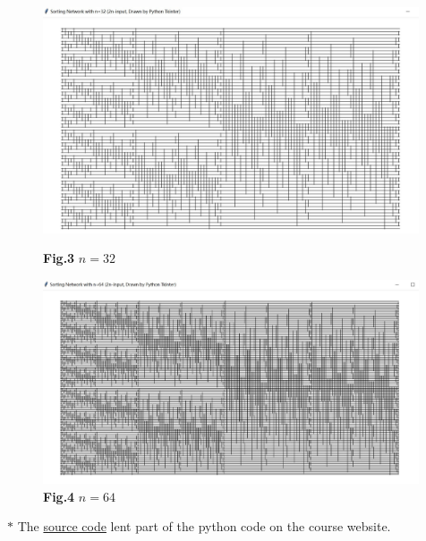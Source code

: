 \documentclass[12pt,a4paper,UTF8]{article}
\theoremstyle{definition}
\begin{document}
\begin{enumerate}
\begin{enumerate}
    	\begin{figure}[htbp]
    		\begin{minipage}[h]{0.48\textwidth}
    			\centering
    			\includegraphics[width=0.99\textwidth]{32.pdf}
    			\caption*{\textbf{Fig.3} $n = 32$} \label{Fig-32}
    		\end{minipage}
    		\hspace{5mm}
    		\begin{minipage}[h]{0.54\textwidth}
    			\centering
    			\includegraphics[width=0.99\textwidth]{64.pdf}
    			\caption*{\textbf{Fig.4} $n = 64$} \label{Fig-64}
    		\end{minipage}
    	\end{figure}	
    	\footnotesize{$*$ The \href{run:OddEvenSortingNetwork-YijiaDiao.py}{source code} lent part of the python code on the course website.}\\
    	

\end{enumerate}
\end{enumerate}
\end{document}
